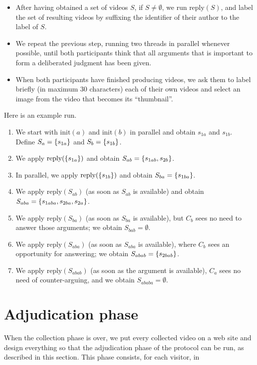 \documentclass[version=3.21, pagesize, twoside=off, bibliography=totoc, DIV=calc, fontsize=12pt, a4paper]{scrartcl}
\begin{document}
\begin{itemize}
	\item After having obtained a set of videos $S$, if $S ≠ \emptyset$, we run $\text{reply}(S)$, and label the set of resulting videos by suffixing the identifier of their author to the label of $S$. 
	\item We repeat the previous step, running two threads in parallel whenever possible, until both participants think that all arguments that is important to form a deliberated judgment has been given.
	\item When both participants have finished producing videos, we ask them to label briefly (in maximum 30 characters) each of their own videos and select an image from the video that becomes its “thumbnail”.
\end{itemize}

\begin{example}
Here is an example run.
\begin{enumerate}
	\item We start with $\text{init}(a)$ and $\text{init}(b)$ in parallel and obtain $s_{1a}$ and $s_{1b}$. Define $S_{a} = \{s_{1a}\}$ and $S_{b} = \{s_{1b}\}$.
	\item We apply $\text{reply}(\{s_{1a}\})$ and obtain $S_{ab} = \{s_{1ab}, s_{2b}\}$.
	\item In parallel, we apply $\text{reply}(\{s_{1b}\})$ and obtain $S_{ba} = \{s_{1ba}\}$.
	\item We apply $\text{reply}(S_{ab})$ (as soon as $S_{ab}$ is available) and obtain $S_{aba} = \{s_{1aba}, s_{2ba}, s_{2a}\}$.
	\item We apply $\text{reply}(S_{ba})$ (as soon as $S_{ba}$ is available), but $C_b$ sees no need to answer those arguments; we obtain $S_{bab} = \emptyset$.
	\item We apply $\text{reply}(S_{aba})$ (as soon as $S_{aba}$ is available), where $C_b$ sees an opportunity for answering; we obtain $S_{abab} = \{s_{2bab}\}$.
	\item We apply $\text{reply}(S_{abab})$ (as soon as the argument is available), $C_a$ sees no need of counter-arguing, and we obtain $S_{ababa} = \emptyset$.
\end{enumerate}
\end{example}

\section{Adjudication phase}
When the collection phase is over, we put every collected video on a web site and design everything so that the adjudication phase of the protocol can be run, as described in this section. This phase consists, for each visitor, in 
\end{document}
